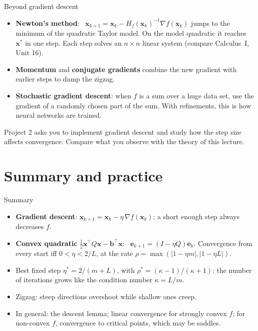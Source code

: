 \documentclass[10pt]{wosm-slides}
\newcommand{\vx}{\mathbf{x}}
\newcommand{\vb}{\mathbf{b}}
\newcommand{\ve}{\mathbf{e}}
\begin{document}
\begin{frame}{Beyond gradient descent}
  \begin{itemize}
    \item \textbf{Newton's method}: \ $\vx_{k+1} = \vx_k - H_f(\vx_k)^{-1}\nabla f(\vx_k)$ jumps to the
      minimum of the quadratic Taylor model. On the model quadratic it reaches $\vx^*$ in one step.
      Each step solves an $n \times n$ linear system (compare Calculus~I, Unit 16).
    \item \textbf{Momentum} and \textbf{conjugate gradients} combine the new gradient with earlier
      steps to damp the zigzag.
    \item \textbf{Stochastic gradient descent}: when $f$ is a sum over a huge data set, use the
      gradient of a randomly chosen part of the sum. With refinements, this is how neural networks are trained.
  \end{itemize}
  \pause
  \begin{remark}[Project 2]
    Project 2 asks you to implement gradient descent and study how the step size affects
    convergence. Compare what you observe with the theory of this lecture.
  \end{remark}
\end{frame}

\section{Summary and practice}

\begin{frame}{Summary}
  \begin{itemize}
    \item \textbf{Gradient descent}: $\vx_{k+1} = \vx_k - \eta\,\nabla f(\vx_k)$; a short enough
      step always decreases $f$.
    \item \textbf{Convex quadratic} $\frac12\vx^\top Q\vx - \vb^\top\vx$: \ $\ve_{k+1} = (I - \eta Q)\ve_k$.
      Convergence from every start iff $0 < \eta < 2/L$, at the rate
      $\rho = \max(|1 - \eta m|, |1 - \eta L|)$.
    \item Best fixed step $\eta^* = 2/(m + L)$, with $\rho^* = (\kappa - 1)/(\kappa + 1)$: the
      number of iterations grows like the condition number $\kappa = L/m$.
    \item Zigzag: steep directions overshoot while shallow ones creep.
    \item In general: the descent lemma; linear convergence for strongly convex $f$; for non-convex
      $f$, convergence to critical points, which may be saddles.
  \end{itemize}
\end{frame}
\end{document}
